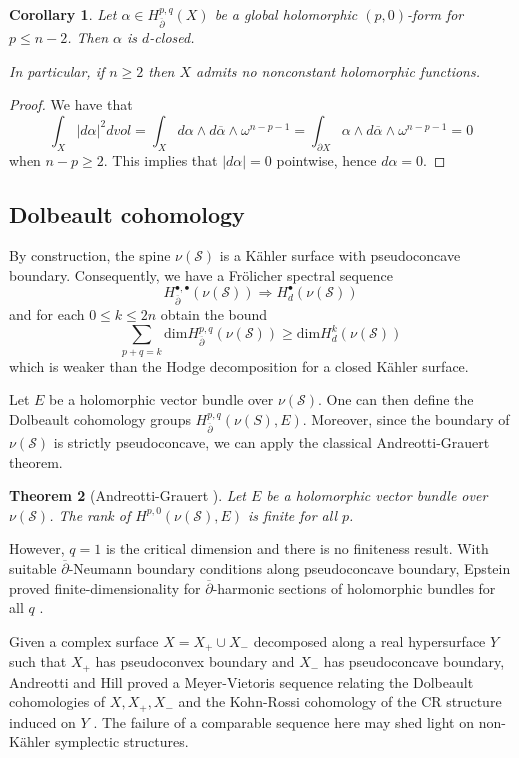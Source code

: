 \documentclass[11pt]{amsart}
\newtheorem{theorem}{Theorem}[section]
\newtheorem{corollary}[theorem]{Corollary}
\theoremstyle{definition}
\theoremstyle{remark}
\numberwithin{equation}{section}
\newcommand{\dbar}{\overline{\del}}
\newcommand{\cS}{\mathcal{S}}
\newcommand{\del}{\partial}
\begin{document}
\begin{corollary}
    Let $\alpha \in H^{p,q}_{\dbar}(X)$ be a global holomorphic $(p,0)$-form for $p  \leq n-2$.  Then $\alpha$ is $d$-closed.

    In particular, if $n \geq 2$ then $X$ admits no nonconstant holomorphic functions.
\end{corollary}

\begin{proof}
    We have that
    \[\int_X |d \alpha|^2 dvol = \int_X d \alpha \wedge d \overline{\alpha} \wedge \omega^{n - p - 1} = \int_{\partial X} \alpha \wedge d \overline{\alpha} \wedge \omega^{n-p-1} = 0\]
    when $n - p \geq 2$.  This implies that $|d \alpha| = 0$ pointwise, hence $d \alpha = 0$.
\end{proof}

\subsection{Dolbeault cohomology}

By construction, the spine $\nu(\cS)$ is a K\"ahler surface with pseudoconcave boundary.  Consequently, we have a Fr\"olicher spectral sequence
\[H^{\bullet,\bullet}_{\dbar}(\nu(\cS)) \Rightarrow H^{\bullet}_{d}(\nu(\cS))\]
and for each $0 \leq k \leq 2n$ obtain the bound
\[\sum_{p+q = k} \text{dim} H^{p,q}_{\dbar}(\nu(\cS)) \geq \text{dim}H^k_{d}(\nu(\cS))\]
which is weaker than the Hodge decomposition for a closed K\"ahler surface.

Let $E$ be a holomorphic vector bundle over $\nu(\cS)$.  One can then define the Dolbeault cohomology groups $H^{p,q}_{\dbar}(\nu(S),E)$.  Moreover, since the boundary of $\nu(\cS)$ is strictly pseudoconcave, we can apply the classical Andreotti-Grauert theorem.

\begin{theorem}[Andreotti-Grauert \cite{AG-finite}]
    Let $E$ be a holomorphic vector bundle over $\nu(\cS)$.  The rank of $H^{p,0}(\nu(\cS),E)$ is finite for all $p$.
\end{theorem}

However, $q = 1$ is the critical dimension and there is no finiteness result.  With suitable $\dbar$-Neumann boundary conditions along pseudoconcave boundary, Epstein proved finite-dimensionality for $\dbar$-harmonic sections of holomorphic bundles for all $q$ \cite{Epstein1,Epstein2,Epstein3}.

Given a complex surface $X = X_+ \cup X_-$ decomposed along a real hypersurface $Y$ such that $X_+$ has pseudoconvex boundary and $X_-$ has pseudoconcave boundary, Andreotti and Hill proved a Meyer-Vietoris sequence relating the Dolbeault cohomologies of $X,X_+,X_-$ and the Kohn-Rossi cohomology of the CR structure induced on $Y$ \cite{Andreotti-Hill}.  The failure of a comparable sequence here may shed light on non-K\"ahler symplectic structures.







\end{document}
